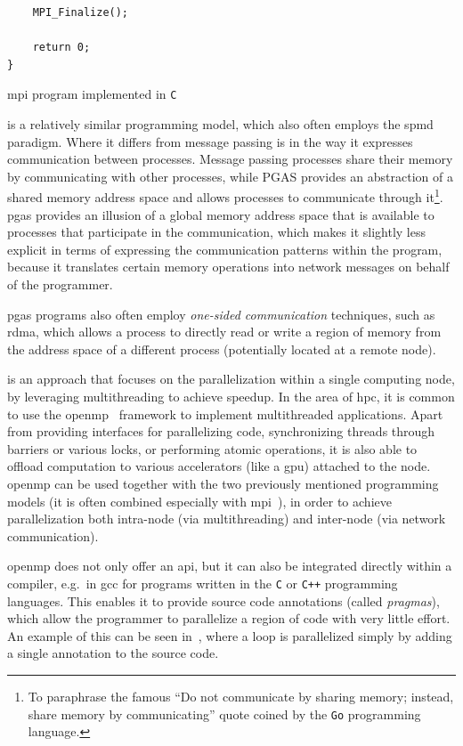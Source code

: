 \begin{description}[wide=0pt]
\begin{listing}[h]
\begin{verbatim}
	MPI_Finalize();

	return 0;
}
		  	\end{verbatim}
			\caption{\gls{mpi} program implemented in \texttt{C}}
			\label{lst:mpi-example}
		\end{listing}

	\item[\gls{pgas}~\cite{pgas}] is a relatively similar programming model, which also often employs the \gls{spmd}
		paradigm. Where it differs from message passing is in the way it expresses communication between
		processes. Message passing processes share their memory by communicating with other processes,
		while PGAS provides an abstraction of a shared memory address space and allows processes to
		communicate through it\footnote{To paraphrase the famous ``Do not communicate by sharing memory; instead, share memory by communicating'' quote coined by the \texttt{Go} programming language.}. \gls{pgas} provides an illusion of a
		global memory address space that is available to processes that participate in the communication,
		which makes it slightly less explicit in terms of expressing the communication patterns within the
		program, because it translates certain memory operations into network messages on behalf of the
		programmer.

		\gls{pgas} programs also often employ \emph{one-sided communication} techniques, such
		as \gls{rdma}, which allows a process to directly read or write a region of memory from
		the address space of a different process (potentially located at a remote node).

	\item[Shared-memory multiprocessing] is an approach that focuses on the parallelization within a single computing node, by leveraging
		multithreading to achieve speedup. In the area of \gls{hpc}, it is common to use the
		\gls{openmp}~\cite{openmp} framework to implement multithreaded applications.
		Apart from providing interfaces for parallelizing code, synchronizing threads through barriers or
		various locks, or performing atomic operations, it is also able to offload computation to various
		accelerators (like a \gls{gpu}) attached to the node. \gls{openmp} can be
		used together with the two previously mentioned programming models (it is often combined especially
		with \gls{mpi}~\cite{hybrid_openmp_mpi}), in order to achieve parallelization both
		intra-node (via multithreading) and inter-node (via network communication).

		\gls{openmp} does not only offer an \gls{api}, but it can also be
		integrated directly within a compiler, e.g.\ in \gls{gcc} for programs written in the
		\texttt{C} or \texttt{C++} programming languages. This enables it to provide
		source code annotations (called \emph{pragmas}), which allow the programmer to parallelize
		a region of code with very little effort. An example of this can be seen in~,
		where a loop is parallelized simply by adding a single annotation to the source code.


\end{description}
